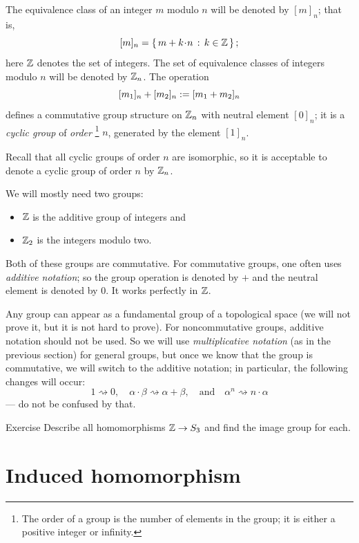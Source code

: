 The equivalence class of an integer $m$ modulo $n$ will be denoted by $[m]_n$;
that is,
\[[m]_n =\set{m+k\cdot n}{k\in\ZZ};\]
here $\mathbb{Z}$ denotes the set of integers.
The set of equivalence classes of integers modulo $n$ will be denoted by $\mathbb{Z}_n$.
The operation
\[[m_1]_n\z+[m_2]_n\df[m_1+m_2]_n\]
defines a commutative group structure on $\mathbb{Z}_n$ with neutral element $[0]_n$;
it is a \emph{cyclic group} of \emph{order}%
\footnote{The order of a group is the number of elements in the group; it is either a positive integer or infinity.}
$n$, generated by the element $[1]_n$.

Recall that all cyclic groups of order $n$ are isomorphic, so it is acceptable to denote a cyclic group of order $n$ by $\mathbb{Z}_n$.

We will mostly need two groups:
\begin{itemize}
\item $\mathbb{Z}$ is the additive group of integers and
\item $\mathbb{Z}_2$ is the integers modulo two.
\end{itemize}

Both of these groups are commutative.
For commutative groups, one often uses \emph{additive notation};
so the group operation is denoted by $+$ and the neutral element is denoted by $0$.
It works perfectly in $\mathbb{Z}$.

Any group can appear as a fundamental group of a topological space (we will not prove it, but it is not hard to prove).
For noncommutative groups, additive notation should not be used.
So we will use \emph{multiplicative notation} (as in the previous section) for general groups, but once we know that the group is commutative, we will switch to the additive notation; in particular, the following changes will occur:
\[1\rightsquigarrow0,\quad \alpha\cdot\beta\rightsquigarrow\alpha+\beta,\quad\text{and}\quad \alpha^n\rightsquigarrow n\cdot\alpha\] --- do not be confused by that.

\begin{thm}{Exercise}\label{ex:Z->S3}
Describe all homomorphisms $\mathbb{Z}\to S_3$ and find the image group for each.
\end{thm}


\section{Induced homomorphism}\label{sec:Induced homomorphism}

